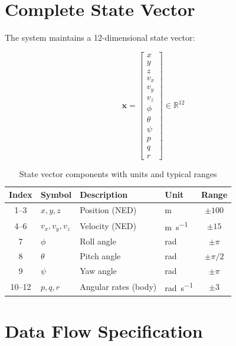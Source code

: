 \section{Complete State Vector}

The system maintains a 12-dimensional state vector:

\begin{equation}
    \mathbf{x} = \begin{bmatrix}
        x \\ y \\ z \\ v_x \\ v_y \\ v_z \\ \phi \\ \theta \\ \psi \\ p \\ q \\ r
    \end{bmatrix} \in \mathbb{R}^{12}
\end{equation}

\begin{table}[htbp]
    \centering
    \caption{State vector components with units and typical ranges}
    \label{tab:state_vector}
    \begin{tabular}{@{}clllc@{}}
        \toprule
        \textbf{Index} & \textbf{Symbol} & \textbf{Description} & \textbf{Unit} & \textbf{Range} \\
        \midrule
        1--3 & $x, y, z$ & Position (NED) & \si{\meter} & $\pm 100$ \\
        4--6 & $v_x, v_y, v_z$ & Velocity (NED) & \si{\meter\per\second} & $\pm 15$ \\
        7 & $\phi$ & Roll angle & \si{\radian} & $\pm\pi$ \\
        8 & $\theta$ & Pitch angle & \si{\radian} & $\pm\pi/2$ \\
        9 & $\psi$ & Yaw angle & \si{\radian} & $\pm\pi$ \\
        10--12 & $p, q, r$ & Angular rates (body) & \si{\radian\per\second} & $\pm 3$ \\
        \bottomrule
    \end{tabular}
\end{table}

\section{Data Flow Specification}


